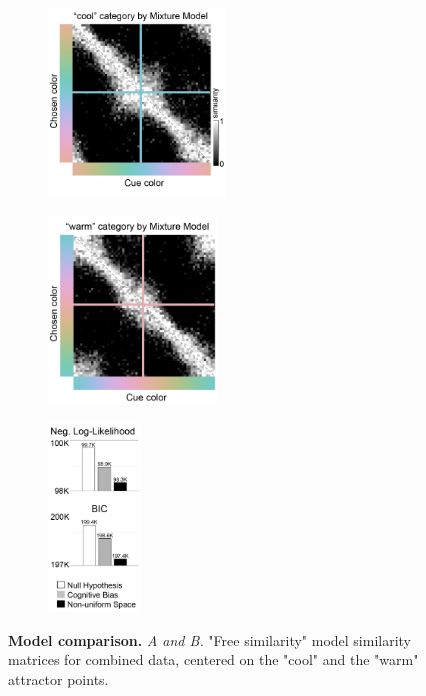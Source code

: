 {\begin{figure}
    \centering
    \begin{subfigure}[t]{0.33\textwidth}
         \centering
         \caption{}
         \includegraphics[height=5cm]{../Figures/working/F4_TCCResults/a.png}         \label{fig:SimilarityMatrixCombined_Cool}
    \end{subfigure}
    \hfill
    \begin{subfigure}[t]{0.33\textwidth}
         \centering
         \caption{}
         \includegraphics[height=5cm]{../Figures/working/F4_TCCResults/b.png}   \label{fig:SimilarityMatrixCombined_Warm}
    \end{subfigure}
    \hfill
       \begin{subfigure}[t]{0.29\textwidth}
         \centering
         \caption{}
         \includegraphics[height=5cm]{../Figures/working/F4_TCCResults/c.png}   
         \label{fig:Combined-ModelFitAnalysis}
    \end{subfigure}
    \caption{\textbf{Model comparison.}
    \emph{A and B.} "Free similarity" model similarity matrices for combined data, centered on the "cool" and the "warm" attractor points. 
}
\end{figure}}
